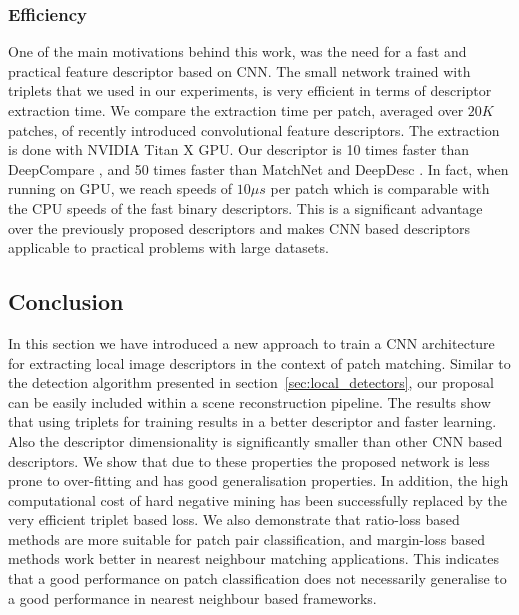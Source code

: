 \subsubsection{Efficiency}
One of the main motivations behind this work, was the need for a fast
and practical feature descriptor based on CNN. The small network trained with triplets
that we used in our experiments, is very
efficient in terms of descriptor extraction time.  We compare the extraction time
 per patch, averaged over $20K$ patches, of  recently
introduced convolutional feature descriptors. The extraction is done with NVIDIA Titan X GPU.
Our descriptor is 10 times faster than
DeepCompare \cite{ZagoruykoCVPR2015}, and 50 times faster than
MatchNet \cite{Han_2015_CVPR} and DeepDesc \cite{simo2015deepdesc}. In fact, when running on GPU, we reach speeds of ${10\mu s}$ per patch which is comparable with the CPU speeds of the fast binary
descriptors\cite{Calonder:2010:BBR:1888089.1888148}. This is a significant advantage over the previously proposed descriptors and
makes CNN based descriptors applicable to practical problems with
large datasets.

\subsection{Conclusion}
In this section we have introduced a new approach to train a CNN architecture for extracting local image descriptors in the context of patch matching. Similar to the detection algorithm presented in section~\ref{sec:local_detectors}, our proposal can be easily included within a scene reconstruction pipeline. The results show that using triplets for training results in a better descriptor and faster learning. Also the descriptor dimensionality is significantly smaller than other CNN based descriptors. We show that due to these properties the proposed network is less prone to over-fitting and has good generalisation properties.  In addition, the high computational cost of hard negative
mining has been successfully replaced by the very efficient triplet based loss. We also demonstrate that ratio-loss based methods are more suitable for patch pair classification, and margin-loss based methods work better in nearest neighbour matching applications.  This indicates that a good performance on patch classification does not necessarily
generalise to a good performance in nearest neighbour based frameworks.